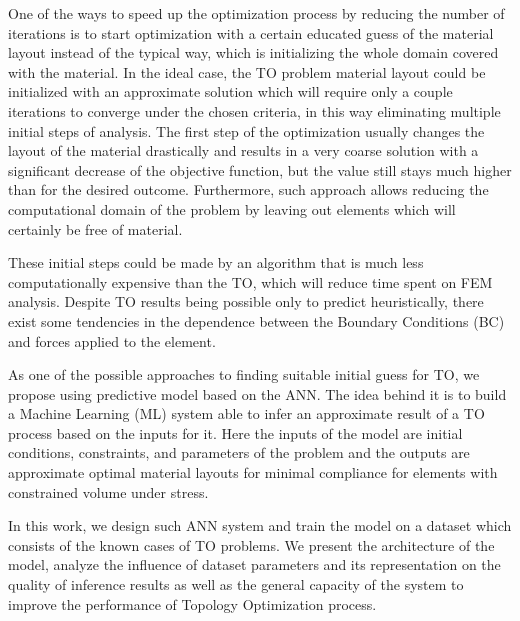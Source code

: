 One of the ways to speed up the optimization process by reducing the number of iterations is to start optimization with a certain educated guess of the material layout instead of the typical way, which is initializing the whole domain covered with the material.
In the ideal case, the TO problem material layout could be initialized with an approximate solution which will require only a couple iterations to converge under the chosen criteria, in this way eliminating multiple initial steps of analysis.
The first step of the optimization usually changes the layout of the material drastically and results in a very coarse solution with a significant decrease of the objective function, but the value still stays much higher than for the desired outcome. 
Furthermore, such approach allows reducing the computational domain of the problem by leaving out elements which will certainly be free of material.
\medskip
{}

These initial steps could be made by an algorithm that is much less computationally expensive than the TO, which will reduce time spent on FEM analysis. 
Despite TO results being possible only to predict heuristically, there exist some tendencies in the dependence between the Boundary Conditions (BC) and forces applied to the element. 
\medskip

As one of the possible approaches to finding suitable initial guess for TO, we propose using predictive model based on the ANN.
The idea behind it is to build a Machine Learning (ML) system able to infer an approximate result of a TO process based on the inputs for it.
Here the inputs of the model are initial conditions, constraints, and parameters of the problem and the outputs are approximate optimal material layouts for minimal compliance for elements with constrained volume under stress.
\medskip

In this work, we design such ANN system and train the model on a dataset which consists of the known cases of TO problems. 
We present the architecture of the model, analyze the influence of dataset parameters and its representation on the quality of inference results as well as the general capacity of the system to improve the performance of Topology Optimization process.  
\medskip

